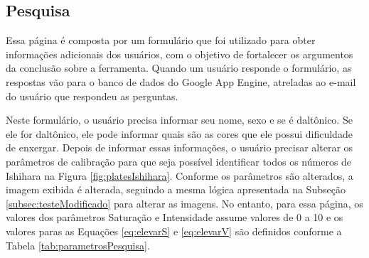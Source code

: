 \documentclass[	12pt, Times, openright, twoside, a4paper, english, brazil]{abntex2}
\begin{document}
\subsection{Pesquisa}
\label{subsec:pesquisa}

Essa página é composta por um formulário que foi utilizado para obter informações adicionais dos usuários, com o objetivo de fortalecer os argumentos da conclusão sobre a ferramenta. Quando um usuário responde o formulário, as respostas vão para o banco de dados do Google App Engine, atreladas ao e-mail do usuário que respondeu as perguntas.


Neste formulário, o usuário precisa informar seu nome, sexo e se é daltônico. Se ele for daltônico, ele pode informar quais são as cores que ele possui dificuldade de enxergar. Depois de informar essas informações, o usuário precisar alterar os parâmetros de calibração para que seja possível identificar todos os números de Ishihara na Figura \ref{fig:platesIshihara}. Conforme os parâmetros são alterados, a imagem exibida é alterada, seguindo a mesma lógica apresentada na Subseção \ref{subsec:testeModificado} para alterar as imagens. No entanto, para essa página, os valores dos parâmetros Saturação e Intensidade assume valores de 0 a 10 e os valores paras as Equações \ref{eq:elevarS} e \ref{eq:elevarV} são definidos conforme a Tabela \ref{tab:parametrosPesquisa}. 
\end{document}
